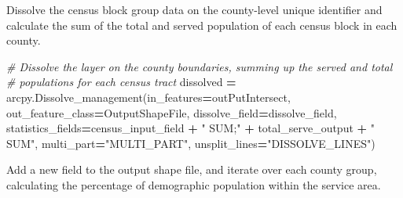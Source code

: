 \documentclass[11pt,]{article}
\newenvironment{Shaded}{\begin{snugshade}}{\end{snugshade}}
\newcommand{\StringTok}[1]{\textcolor[rgb]{0.31,0.60,0.02}{{#1}}}
\newcommand{\CommentTok}[1]{\textcolor[rgb]{0.56,0.35,0.01}{\textit{{#1}}}}
\newcommand{\OperatorTok}[1]{\textcolor[rgb]{0.81,0.36,0.00}{\textbf{{#1}}}}
\newcommand{\NormalTok}[1]{{#1}}
\begin{document}
\noindent Dissolve the census block group data on the county-level
unique identifier and calculate the sum of the total and served
population of each census block in each county.

\begin{Shaded}
\begin{Highlighting}[]
    \CommentTok{# Dissolve the layer on the county boundaries, summing up the served and total}
    \CommentTok{# populations for each census tract}
    \NormalTok{dissolved }\OperatorTok{=} \NormalTok{arcpy.Dissolve_management(in_features}\OperatorTok{=}\NormalTok{outPutIntersect,}
                              \NormalTok{out_feature_class}\OperatorTok{=}\NormalTok{OutputShapeFile,}
                              \NormalTok{dissolve_field}\OperatorTok{=}\NormalTok{dissolve_field, }
                              \NormalTok{statistics_fields}\OperatorTok{=}\NormalTok{census_input_field }\OperatorTok{+} 
                                \StringTok{" SUM;"} \OperatorTok{+} \NormalTok{total_serve_output }\OperatorTok{+} \StringTok{" SUM"}\NormalTok{,}
                              \NormalTok{multi_part}\OperatorTok{=}\StringTok{"MULTI_PART"}\NormalTok{,}
                              \NormalTok{unsplit_lines}\OperatorTok{=}\StringTok{"DISSOLVE_LINES"}\NormalTok{)}
\end{Highlighting}
\end{Shaded}

\noindent Add a new field to the output shape file, and iterate over
each county group, calculating the percentage of demographic population
within the service area.
\end{document}
